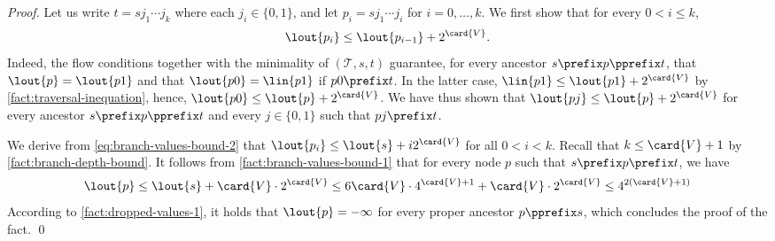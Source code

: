 \FactBranchValuesBoundTwo*
\begin{proof}
  Let us write $t = s j_1 \cdots j_k$ where each $j_i \in \{0, 1\}$,
  and let $p_i = s j_1 \cdots j_i$ for $i = 0, \ldots, k$.
  We first show that for every $0 < i \leq k$,
  \begin{equation}
  \label{eq:branch-values-bound-2}
  \lout{p_i} \leq \lout{p_{i-1}} + 2^{\card{V}}.
  \end{equation}
  Indeed,
  the flow conditions together with
  the minimality of $(\mathcal{T}, s, t)$ guarantee,
  for every ancestor $s \prefix p \pprefix t$,
  that $\lout{p} = \lout{p1}$ and
  that $\lout{p0} = \lin{p1}$ if $p0 \prefix t$.
  In the latter case,
  $\lin{p1} \leq \lout{p1} + 2^{\card{V}}$
  by \cref{fact:traversal-inequation},
  hence,
  $\lout{p0} \leq \lout{p} + 2^{\card{V}}$.
  We have thus shown that
  $\lout{pj} \leq \lout{p} + 2^{\card{V}}$
  for every ancestor $s \prefix p \pprefix t$
  and every $j \in \{0, 1\}$
  such that $pj \prefix t$.


  We derive from \cref{eq:branch-values-bound-2} that
  $\lout{p_i} \leq \lout{s} + i 2^{\card{V}}$
  for all $0 < i < k$.
  Recall that $k \leq \card{V} + 1$ by \cref{fact:branch-depth-bound}.
  It follows from \cref{fact:branch-values-bound-1}
  that for every node $p$ such that $s \prefix p \prefix t$,
  we have
  \begin{equation*}
  \lout{p} \leq \lout{s} + \card{V}\cdot2^{\card{V}}
  \leq 6 \card{V} \cdot 4^{\card{V}+1} + \card{V}\cdot 2^{\card{V}}
\leq 4^{2(\card{V}+1)}
  \end{equation*}
  According to \cref{fact:dropped-values-1},
  it holds that $\lout{p} = -\infty$ for every proper ancestor $p \pprefix s$,
  which concludes the proof of the fact.
  \qed
\end{proof}

